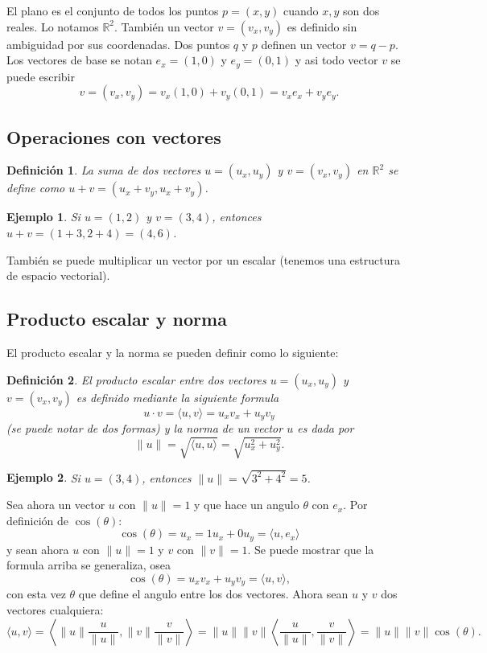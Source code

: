 \documentclass[11pt]{book}
\theoremstyle{definicion}
\theoremstyle{teorema}
\theoremstyle{ejemplo}
\newtheorem{definition}{Definición}
\newtheorem{example}{Ejemplo}
\begin{document}
El plano es el conjunto de todos los puntos $p=(x,y)$ cuando $x,y$ son dos reales. Lo notamos $\mathbb{R}^2$. Tambi\'en un vector $v=(v_x,v_y)$ es definido sin ambiguidad por sus coordenadas.  Dos puntos $q$ y $p$ definen un vector $v=q-p$. Los vectores de base se notan $e_x = (1,0)$ y $e_y = (0,1)$ y asi todo vector $v$ se puede escribir
\[
v = 
(v_x,v_y)
= 
v_x (1,0) + v_y (0,1) =
v_x e_x + v_y e_y.
\]

\subsection{Operaciones con vectores}
\begin{definition}
La suma de dos vectores \(u = (u_x, u_y)\) y \(v = (v_x, v_y)\) en \(\mathbb{R}^2\) se define como \(u + v = (u_x + v_y, u_x + v_y)\).
\end{definition}

\begin{example}
Si \(u = (1, 2)\) y \(v = (3, 4)\), entonces \(u + v = (1 + 3, 2 + 4) = (4, 6)\).
\end{example}

Tambi\'en se puede multiplicar un vector por un escalar (tenemos una estructura de espacio vectorial).

\subsection{Producto escalar y norma}

\noindent 
El producto escalar y la norma se pueden definir como lo siguiente:
\begin{definition}
El producto escalar entre dos vectores $u=(u_x,u_y)$ y $v=(v_x,v_y)$ es definido mediante la siguiente formula
\[
u \cdot v = \langle u , v \rangle = u_x v_x + u_y v_y 
\]
(se puede notar de dos formas)
y la norma de un vector $u$ es dada
por
\[
\| u \| = \sqrt{\langle u , u \rangle} = \sqrt{u_x^2 + u_y^2}.
\]
%
\end{definition}

\begin{example}
Si \(u = (3, 4)\), entonces \(\|u\| = \sqrt{3^2 + 4^2} = 5\).
\end{example}

Sea ahora un vector $u$ con $\|u\|=1$ y que hace un angulo $\theta$ con $e_x$. Por definici\'on de $\cos(\theta)$:
\[
\cos(\theta) = u_x 
= 1 u_x + 0 u_y = \langle u , e_x \rangle
\]
y sean ahora $u$ con $\|u\|=1$ y $v$ con $\|v\|=1$. Se puede mostrar que la formula arriba se generaliza, osea %
\[
\cos(\theta) = u_x v_x + u_y v_y = \langle u , v \rangle,
\]
con esta vez $\theta$ que define el angulo entre los dos vectores.
Ahora sean $u$ y $v$ dos vectores cualquiera:
\[
\langle u , v \rangle = 
\left \langle \|u\| \frac{u}{\|u\|} , \|v\| \frac{v}{\|v\|} \right \rangle
=
\|u\| \|v\| \left \langle \frac{u}{\|u\|} ,  \frac{v}{\|v\|} \right \rangle
=
\|u\| \|v\| \cos(\theta).
\]
\end{document}
